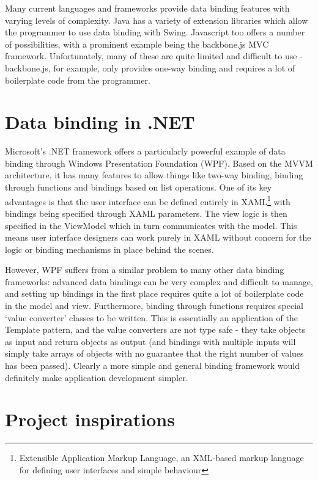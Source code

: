 \documentclass[12pt,twoside,notitlepage]{report}
\begin{document}
Many current languages and frameworks provide data binding features with varying levels of complexity. Java has a variety of extension libraries which allow the programmer to use data binding with Swing. Javascript too offers a number of possibilities, with a prominent example being the backbone.js MVC framework. Unfortunately, many of these are quite limited and difficult to use - backbone.js, for example, only provides one-way binding and requires a lot of boilerplate code from the programmer.

\section{Data binding in .NET}

Microsoft's .NET framework offers a particularly powerful example of data binding through Windows Presentation Foundation (WPF). Based on the MVVM architecture, it has many features to allow things like two-way binding, binding through functions and bindings based on list operations. One of its key advantages is that the user interface can be defined entirely in XAML\footnote{Extensible Application Markup Language, an XML-based markup language for defining user interfaces and simple behaviour} with bindings being specified through XAML parameters. The view logic is then specified in the ViewModel which in turn communicates with the model. This means user interface designers can work purely in XAML without concern for the logic or binding mechanisms in place behind the scenes.

However, WPF suffers from a similar problem to many other data binding frameworks: advanced data bindings can be very complex and difficult to manage, and setting up bindings in the first place requires quite a lot of boilerplate code in the model and view. Furthermore, binding through functions requires special `value converter' classes to be written. This is essentially an application of the Template pattern, and the value converters are not type safe - they take objects as input and return objects as output (and bindings with multiple inputs will simply take arrays of objects with no guarantee that the right number of values has been passed). Clearly a more simple and general binding framework would definitely make application development simpler.

\section{Project inspirations}
\end{document}
